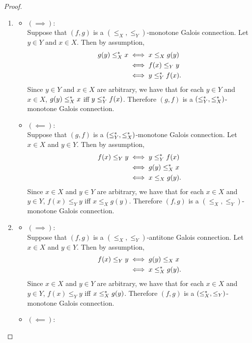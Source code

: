 \documentclass{book}
\begin{document}
	\begin{proof}\
		\begin{enumerate}
			\item 
			\begin{itemize}
				\item $(\implies)$: \\
				Suppose that $(f,g)$ is a $(\leq_X, \leq_Y)$-monotone Galois connection. Let $y \in Y$ and $x \in X$. Then by assumption, 
				\begin{align*}
					g(y) \leq^*_X x
					& \iff x \leq_X g(y) \\
					& \iff f(x) \leq_Y y \\
					& \iff y \leq^*_Y f(x).
				\end{align*}
				Since $y \in Y$ and $x \in X$ are arbitrary, we have that for each $y \in Y$ and $x \in X$, $g(y) \leq^*_X x$ iff $y \leq^*_Y f(x)$. Therefore $(g,f)$ is a $(\leq^*_Y, \leq^*_X)$-monotone Galois connection.
				\item $(\impliedby)$: \\
				Suppose that $(g,f)$ is a $(\leq^*_Y, \leq^*_X)$-monotone Galois connection. Let $x \in X$ and $y \in Y$. Then by assumption, 
				\begin{align*}
					f(x) \leq_Y y
					& \iff y \leq^*_Y f(x) \\
					& \iff g(y) \leq^*_X x \\
					& \iff x \leq_X g(y).
				\end{align*}
				Since $x \in X$ and $y \in Y$ are arbitrary, we have that for each $x \in X$ and $y \in Y$, $f(x) \leq_Y y$ iff $x \leq_X g(y)$. Therefore $(f,g)$ is a $(\leq_X, \leq_Y)$-monotone Galois connection.
			\end{itemize}
			\item 
			\begin{itemize}
				\item $(\implies)$: \\
				Suppose that $(f,g)$ is a $(\leq_X, \leq_Y)$-antitone Galois connection. Let $x \in X$ and $y \in Y$. Then by assumption, 
				\begin{align*}
					f(x) \leq_Y y
					& \iff g(y) \leq_X x \\
					& \iff x \leq^*_X g(y).
				\end{align*}
				Since $x \in X$ and $y \in Y$ are arbitrary, we have that for each $x \in X$ and $y \in Y$, $f(x) \leq_Y y$ iff $x \leq^*_X g(y)$. Therefore $(f,g)$ is a $(\leq^*_X, \leq_Y)$-monotone Galois connection.
				\item $(\impliedby)$: \\

\end{itemize}
\end{enumerate}
\end{proof}
\end{document}
